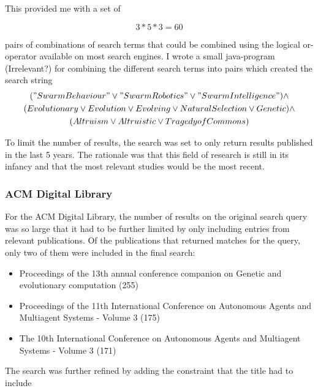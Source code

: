 \documentclass[a4paper]{book}
\begin{document}
This provided me with a set of 

\begin{equation}
\label{eq:comb}
3*5*3 = 60
\end{equation}

\noindent
pairs of combinations of search terms that could be combined using the logical
or-operator available on most search engines. I wrote a small java-program (Irrelevant?) for 
combining the different search terms into pairs which created the search string
\\
\noindent
\begin{multline}
\label{eq:search}
("Swarm Behaviour" \lor "Swarm Robotics" \lor "Swarm Intelligence") \land \\
(Evolutionary \lor Evolution \lor Evolving \lor Natural Selection \lor Genetic) \land \\
(Altruism \lor Altruistic \lor Tragedy of Commons) \\
\end{multline}

To limit the number of results, the search was set to only return results published
in the last 5 years. The rationale was that this field of research is still in
its infancy and that the most relevant studies would be the most recent. 

\subsubsection{ACM Digital Library}
For the ACM Digital Library, the number of results on the original search query
was so large that it had to be further limited by only including entries from 
relevant publications. Of the publications that returned matches for the query,
only two of them were included in the final search:

\begin{itemize}

\item{Proceedings of the 13th annual conference companion on Genetic and evolutionary computation (255)}
\item{Proceedings of the 11th International Conference on Autonomous Agents and Multiagent Systems - Volume 3 (175) }
\item{The 10th International Conference on Autonomous Agents and Multiagent Systems - Volume 3 (171)}

\end{itemize}

The search was further refined by adding the constraint that the title had to include
\end{document}

